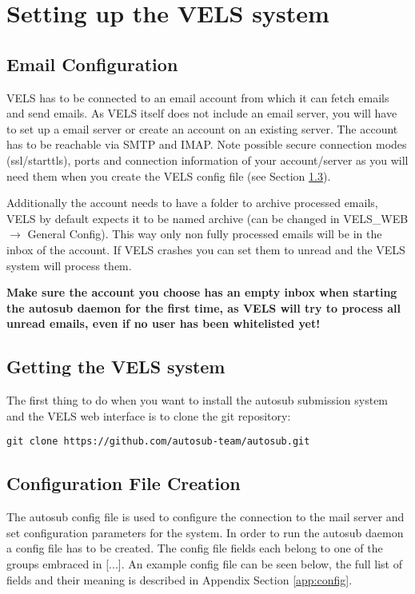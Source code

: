 \section{Setting up the VELS system} \label{system_setup}

\subsection{Email Configuration} \label{sub:emailconfig}
VELS has to be connected to an email account from which it can fetch emails and send emails. 
As VELS itself does not include an email server, you will have to set up a email server or
create an account on an existing server. The account has to be reachable via SMTP and IMAP.
Note possible secure connection modes (ssl/starttls), ports and connection information of 
your account/server as you will need them when you create the VELS config file (see 
Section \ref{sub:exampleconfig}).

Additionally the account needs to have a folder to archive processed emails, VELS by default
expects it to be named archive (can be changed in VELS\_WEB $\rightarrow$ General Config). This way
only non fully processed emails will be in the inbox of the account. If VELS crashes
you can set them to unread and the VELS system will process them.

\textbf{Make sure the account you choose has an empty inbox when starting the autosub daemon for the 
first time, as VELS will try to process all unread emails, even if no user has been whitelisted yet!}

\subsection{Getting the VELS system} \label{sub:serversetup}

The first thing to do when you want to install the autosub submission system and the VELS
web interface is to clone the git repository:

\begin{verbatim}
git clone https://github.com/autosub-team/autosub.git
\end{verbatim}

\subsection{Configuration File Creation} \label{sub:exampleconfig}
The autosub config file is used to configure the connection to the mail server and set
configuration parameters for the system. In order to run the autosub daemon a config file
has to be created. The config file fields each belong to one of the groups embraced 
in [...]. An example config file can be seen below, the full list of fields and their
meaning is described in Appendix Section \ref{app:config}.

